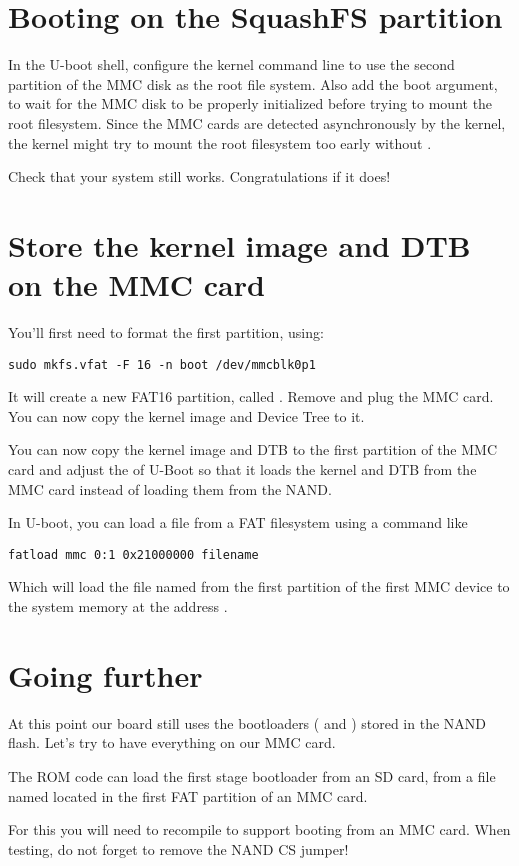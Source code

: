 \section{Booting on the SquashFS partition}

In the U-boot shell, configure the kernel command line to use the
second partition of the MMC disk as the root file system. Also add the
 boot argument, to wait for the MMC disk to be properly
initialized before trying to mount the root filesystem. Since the MMC
cards are detected asynchronously by the kernel, the kernel might try
to mount the root filesystem too early without .

Check that your system still works. Congratulations if it does!

\section{Store the kernel image and DTB on the MMC card}

You'll first need to format the first partition, using:
\begin{verbatim}
sudo mkfs.vfat -F 16 -n boot /dev/mmcblk0p1
\end{verbatim}

It will create a new FAT16 partition, called . Remove and
plug the MMC card. You can now copy the kernel image and Device Tree
to it.

You can now copy the  kernel image and DTB to the first
partition of the MMC card and adjust the  of U-Boot so
that it loads the kernel and DTB from the MMC card instead of loading
them from the NAND.

In U-boot, you can load a file from a FAT filesystem using a command
like

\begin{verbatim}
fatload mmc 0:1 0x21000000 filename
\end{verbatim}

Which will load the file named  from the first
partition of the first MMC device to the system memory at the address
.

\section{Going further}

At this point our board still uses the bootloaders
( and ) stored in the NAND flash.
Let's try to have everything on our MMC card.

The ROM code can load the first stage bootloader from an SD card, from
a file named  located in the first FAT partition of an
MMC card.

For this you will need to recompile  to support
booting from an MMC card. When testing, do not forget to remove the
NAND CS jumper!
